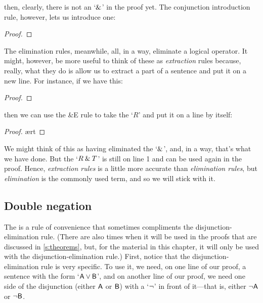 \noindent then, clearly, there is not an `$\mathbin{\&}$' in the proof yet. The conjunction introduction rule, however, lets us introduce one:

\begin{proof}
	 
\end{proof}

The elimination rules, meanwhile, all, in a way, eliminate a logical operator. It might, however, be more useful to think of these as \textit{extraction} rules because, really, what they do is allow us to extract a part of a sentence and put it on a new line. For instance, if we have this:

\begin{proof}
	 \pr{}
\end{proof}

\noindent then we can use the \&E rule to take the `$R$' and put it on a line by itself:

\begin{proof}
	 \ae{rt}
\end{proof}

\noindent We might think of this as having eliminated the `$\mathbin{\&}$', and, in a way, that's what we have done. But the `$R \mathbin{\&} T$' is still on line 1 and can be used again in the proof. Hence, \textit{extraction rules} is a little more accurate than \textit{elimination rules}, but \textit{elimination} is the commonly used term, and so we will stick with it. 


\subsection{Double negation}\label{subsection-DN}

The  is a rule of convenience that sometimes compliments the disjunction-elimination rule. (There are also times when it will be used in the proofs that are discussed in \ref{s:theorems}, but, for the material in this chapter, it will only be used with the disjunction-elimination rule.) First, notice that the disjunction-elimination rule is very specific. To use it, we need, on one line of our proof, a sentence with the form `$\mathsf{A}\vee\mathsf{B}$', and on another line of our proof, we need one side of the disjunction (either $\mathsf{A}$ or $\mathsf{B}$) with a `${\neg}$' in front of it---that is, either ${\neg}\mathsf{A}$ or ${\neg}\mathsf{B}$. 

